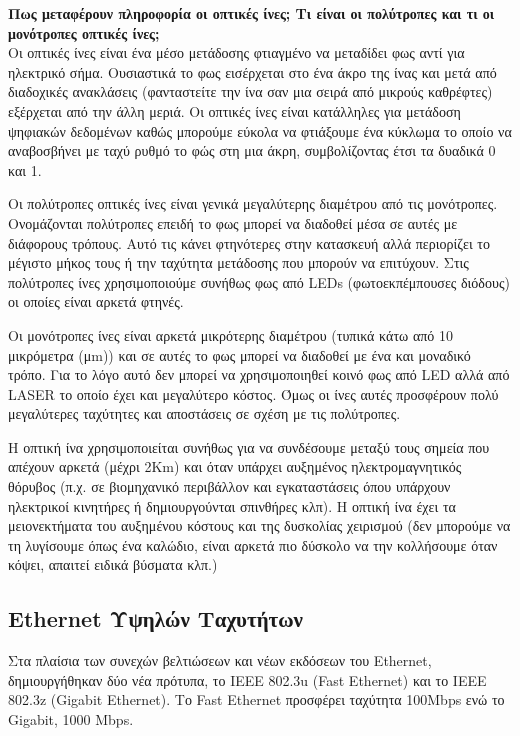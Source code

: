 \parbox{\textwidth}{
\boxline
\textbf{Πως μεταφέρουν πληροφορία οι οπτικές ίνες; Τι είναι οι πολύτροπες και τι οι μονότροπες οπτικές ίνες;}\\

Οι οπτικές ίνες είναι ένα μέσο μετάδοσης φτιαγμένο να μεταδίδει φως αντί για ηλεκτρικό σήμα. Ουσιαστικά το φως εισέρχεται στο ένα άκρο της ίνας και μετά από διαδοχικές ανακλάσεις (φανταστείτε την ίνα σαν μια σειρά από μικρούς καθρέφτες) εξέρχεται από την άλλη μεριά. Οι οπτικές ίνες είναι κατάλληλες για μετάδοση ψηφιακών δεδομένων καθώς μπορούμε εύκολα να φτιάξουμε ένα κύκλωμα το οποίο να αναβοσβήνει με ταχύ ρυθμό το φώς στη μια άκρη, συμβολίζοντας έτσι τα δυαδικά 0 και 1.}

Οι πολύτροπες οπτικές ίνες είναι γενικά μεγαλύτερης διαμέτρου από τις μονότροπες. Ονομάζονται πολύτροπες επειδή το φως μπορεί να διαδοθεί μέσα σε αυτές με διάφορους τρόπους. Αυτό τις κάνει φτηνότερες στην κατασκευή αλλά περιορίζει το μέγιστο μήκος τους ή την ταχύτητα μετάδοσης που μπορούν να επιτύχουν. Στις πολύτροπες ίνες χρησιμοποιούμε συνήθως φως από LEDs (φωτοεκπέμπουσες διόδους) οι οποίες είναι αρκετά φτηνές. 

Οι μονότροπες ίνες είναι αρκετά μικρότερης διαμέτρου (τυπικά κάτω από 10 μικρόμετρα (μm)) και σε αυτές το φως μπορεί να διαδοθεί με ένα και μοναδικό τρόπο. Για το λόγο αυτό δεν μπορεί να χρησιμοποιηθεί κοινό φως από LED αλλά από LASER το οποίο έχει και μεγαλύτερο κόστος. Όμως οι ίνες αυτές προσφέρουν πολύ μεγαλύτερες ταχύτητες και αποστάσεις σε σχέση με τις πολύτροπες. \\
\boxline

Η οπτική ίνα χρησιμοποιείται συνήθως για να συνδέσουμε μεταξύ τους σημεία που απέχουν αρκετά (μέχρι 2Km) και όταν υπάρχει αυξημένος ηλεκτρομαγνητικός θόρυβος (π.χ. σε βιομηχανικό περιβάλλον και εγκαταστάσεις όπου υπάρχουν ηλεκτρικοί κινητήρες ή δημιουργούνται σπινθήρες κλπ). Η οπτική ίνα έχει τα μειονεκτήματα του αυξημένου κόστους και της δυσκολίας χειρισμού (δεν μπορούμε να τη λυγίσουμε όπως ένα καλώδιο, είναι αρκετά πιο δύσκολο να την κολλήσουμε όταν κόψει, απαιτεί ειδικά βύσματα κλπ.)

\subsection*{Ethernet Υψηλών Ταχυτήτων}

Στα πλαίσια των συνεχών βελτιώσεων και νέων εκδόσεων του Ethernet, δημιουργήθηκαν δύο νέα πρότυπα, το IEEE 802.3u (Fast Ethernet) και το IEEE 802.3z (Gigabit Ethernet). Το Fast Ethernet προσφέρει ταχύτητα 100Mbps ενώ το Gigabit, 1000 Mbps.

